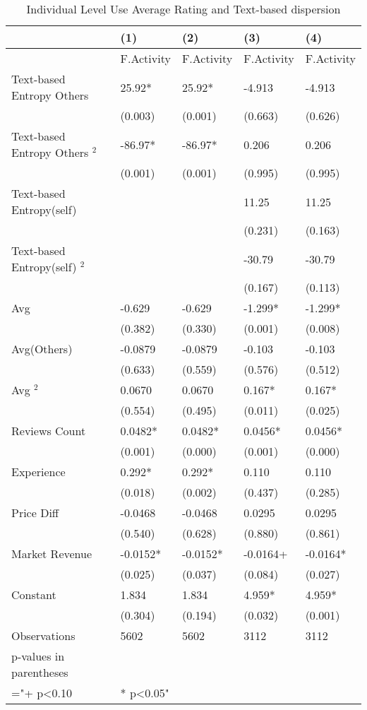 \begin{table}
\centering
\begin{tabular}{@{}lllll@{}}
\toprule
 & (1) & (2) & (3) & (4) \\ \midrule
 & F.Activity & F.Activity & F.Activity & F.Activity \\
Text-based Entropy Others & 25.92* & 25.92* & -4.913 & -4.913 \\
 & (0.003) & (0.001) & (0.663) & (0.626) \\
Text-based Entropy Others $^2$ & -86.97* & -86.97* & 0.206 & 0.206 \\
 & (0.001) & (0.001) & (0.995) & (0.995) \\
Text-based Entropy(self) &  &  & 11.25 & 11.25 \\
 &  &  & (0.231) & (0.163) \\
Text-based Entropy(self) $^2$ &  &  & -30.79 & -30.79 \\
 &  &  & (0.167) & (0.113) \\
Avg & -0.629 & -0.629 & -1.299* & -1.299* \\
 & (0.382) & (0.330) & (0.001) & (0.008) \\
Avg(Others) & -0.0879 & -0.0879 & -0.103 & -0.103 \\
 & (0.633) & (0.559) & (0.576) & (0.512) \\
Avg $^2$ & 0.0670 & 0.0670 & 0.167* & 0.167* \\
 & (0.554) & (0.495) & (0.011) & (0.025) \\
Reviews Count & 0.0482* & 0.0482* & 0.0456* & 0.0456* \\
 & (0.001) & (0.000) & (0.001) & (0.000) \\
Experience & 0.292* & 0.292* & 0.110 & 0.110 \\
 & (0.018) & (0.002) & (0.437) & (0.285) \\
Price Diff & -0.0468 & -0.0468 & 0.0295 & 0.0295 \\
 & (0.540) & (0.628) & (0.880) & (0.861) \\
Market Revenue & -0.0152* & -0.0152* & -0.0164+ & -0.0164* \\
 & (0.025) & (0.037) & (0.084) & (0.027) \\
Constant & 1.834 & 1.834 & 4.959* & 4.959* \\
 & (0.304) & (0.194) & (0.032) & (0.001) \\
Observations & 5602 & 5602 & 3112 & 3112 \\
p-values in parentheses &  &  &  &  \\
="+ p\textless{}0.10 & * p\textless{}0.05" &  &  &  \\ \bottomrule
\end{tabular}
\caption{Individual Level Use Average Rating and Text-based dispersion}
\label{reg_ind_2}
\end{table}
